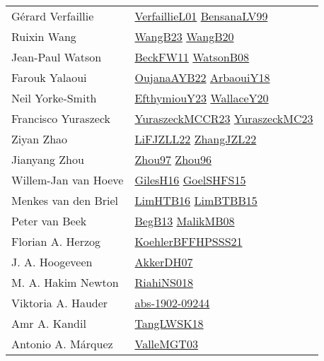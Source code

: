 {\begin{longtable}{p{4cm}p{20cm}}
G{\'{e}}rard Verfaillie & \href{papers/VerfaillieL01.pdf}{VerfaillieL01}\cite{VerfaillieL01} \href{articles/BensanaLV99.pdf}{BensanaLV99}\cite{BensanaLV99} \\
Ruixin Wang & \href{papers/WangB23.pdf}{WangB23}\cite{WangB23} \href{papers/WangB20.pdf}{WangB20}\cite{WangB20} \\
Jean{-}Paul Watson & \href{}{BeckFW11}\cite{BeckFW11} \href{papers/WatsonB08.pdf}{WatsonB08}\cite{WatsonB08} \\
Farouk Yalaoui & \href{papers/OujanaAYB22.pdf}{OujanaAYB22}\cite{OujanaAYB22} \href{papers/ArbaouiY18.pdf}{ArbaouiY18}\cite{ArbaouiY18} \\
Neil Yorke{-}Smith & \href{papers/EfthymiouY23.pdf}{EfthymiouY23}\cite{EfthymiouY23} \href{articles/WallaceY20.pdf}{WallaceY20}\cite{WallaceY20} \\
Francisco Yuraszeck & \href{articles/YuraszeckMCCR23.pdf}{YuraszeckMCCR23}\cite{YuraszeckMCCR23} \href{papers/YuraszeckMC23.pdf}{YuraszeckMC23}\cite{YuraszeckMC23} \\
Ziyan Zhao & \href{papers/LiFJZLL22.pdf}{LiFJZLL22}\cite{LiFJZLL22} \href{papers/ZhangJZL22.pdf}{ZhangJZL22}\cite{ZhangJZL22} \\
Jianyang Zhou & \href{articles/Zhou97.pdf}{Zhou97}\cite{Zhou97} \href{papers/Zhou96.pdf}{Zhou96}\cite{Zhou96} \\
Willem{-}Jan van Hoeve & \href{papers/GilesH16.pdf}{GilesH16}\cite{GilesH16} \href{articles/GoelSHFS15.pdf}{GoelSHFS15}\cite{GoelSHFS15} \\
Menkes van den Briel & \href{papers/LimHTB16.pdf}{LimHTB16}\cite{LimHTB16} \href{papers/LimBTBB15.pdf}{LimBTBB15}\cite{LimBTBB15} \\
Peter van Beek & \href{}{BegB13}\cite{BegB13} \href{}{MalikMB08}\cite{MalikMB08} \\
Florian A. Herzog & \href{articles/KoehlerBFFHPSSS21.pdf}{KoehlerBFFHPSSS21}\cite{KoehlerBFFHPSSS21} \\
J. A. Hoogeveen & \href{papers/AkkerDH07.pdf}{AkkerDH07}\cite{AkkerDH07} \\
M. A. Hakim Newton & \href{papers/RiahiNS018.pdf}{RiahiNS018}\cite{RiahiNS018} \\
Viktoria A. Hauder & \href{articles/abs-1902-09244.pdf}{abs-1902-09244}\cite{abs-1902-09244} \\
Amr A. Kandil & \href{}{TangLWSK18}\cite{TangLWSK18} \\
Antonio A. M{\'{a}}rquez & \href{papers/ValleMGT03.pdf}{ValleMGT03}\cite{ValleMGT03} \\

\end{longtable}}
